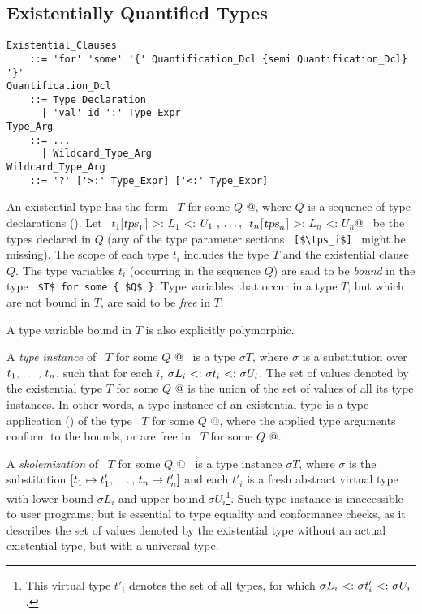\subsection{Existentially Quantified Types}
\label{sec:existential-types}

\grammar\begin{lstlisting}
Existential_Clauses
    ::= 'for' 'some' '{' Quantification_Dcl {semi Quantification_Dcl} '}'
Quantification_Dcl
    ::= Type_Declaration
      | 'val' id ':' Type_Expr
Type_Arg
    ::= ...
      | Wildcard_Type_Arg
Wildcard_Type_Arg
    ::= '?' ['>:' Type_Expr] ['<:' Type_Expr] 
\end{lstlisting}

An existential type has the form ~\lstinline@$T$ for some { $Q$ }@, where $Q$ is a sequence of type declarations (). Let ~\lstinline@$t_1$[$\mbox{\sl tps}_1$] >: $L_1$ <: $U_1\ ,\, \ldots ,\,\ t_n$[$\mbox{\sl tps}_n$] >: $L_n$ <: $U_n$@~ be the types declared in $Q$ (any of the type parameter sections ~\lstinline![$\tps_i$]!~ might be missing). The scope of each type $t_i$ includes the type $T$ and the existential clause $Q$. The type variables $t_i$ (occurring in the sequence $Q$) are said to be {\em bound} in the type ~\lstinline!$T$ for some { $Q$ }!. Type variables that occur in a type $T$, but which are not bound in $T$, are said to be {\em free} in $T$. 

A type variable bound in $T$ is also explicitly polymorphic. 

A {\em type instance} of ~\lstinline@$T$ for some { $Q$ }@~ is a type $\sigma T$, where $\sigma$ is a substitution over $t_1 ,\, \ldots ,\, t_n$, such that for each $i$, $\sigma L_i \conforms \sigma t_i \conforms \sigma U_i$. The set of values denoted by the existential type \lstinline@$T$ for some { $Q$ }@ is the union of the set of values of all its type instances. In other words, a type instance of an existential type is a type application () of the type ~\lstinline@$T$ for some { $Q$ }@, where the applied type arguments conform to the bounds, or are free in ~\lstinline@$T$ for some { $Q$ }@. 

A {\em skolemization} of ~\lstinline@$T$ for some { $Q$ }@~ is a type instance $\sigma T$, where $\sigma$ is the substitution $[t_1 \mapsto t'_1 ,\, \ldots ,\, t_n \mapsto t'_n]$ and each $t'_i$ is a fresh abstract virtual type with lower bound $\sigma L_i$ and upper bound $\sigma U_i$\footnote{This virtual type $t'_i$ denotes the set of all types, for which $\sigma L_i \conforms \sigma t'_i \conforms \sigma U_i$.}. Such type instance is inaccessible to user programs, but is essential to type equality and conformance checks, as it describes the set of values denoted by the existential type without an actual existential type, but with a universal type. 



